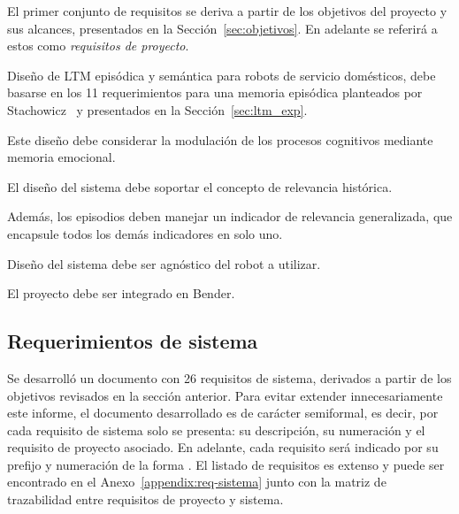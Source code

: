 El primer conjunto de requisitos se deriva a partir de los objetivos del proyecto y sus alcances, presentados en la Sección~\ref{sec:objetivos}. En adelante se referirá a estos como \textit{requisitos de proyecto}.
\begin{description}
\item {} Diseño de LTM episódica y semántica para robots de servicio domésticos, debe basarse en los 11 requerimientos para una memoria episódica planteados por Stachowicz~\cite{Stachowicz2012} y presentados en la Sección~\ref{sec:ltm_exp}.
\item {} Este diseño debe considerar la modulación de los procesos cognitivos mediante memoria emocional.
\item {} El diseño del sistema debe soportar el concepto de relevancia histórica.
\item {} Además, los episodios deben manejar un indicador de relevancia generalizada, que encapsule todos los demás indicadores en solo uno.
\item {} Diseño del sistema debe ser agnóstico del robot a utilizar.
\item {} El proyecto debe ser integrado en Bender.
\end{description}


\subsection{Requerimientos de sistema}

Se desarrolló un documento con 26 requisitos de sistema, derivados a partir de los objetivos revisados en la sección anterior. Para evitar extender innecesariamente este informe, el documento desarrollado es de carácter semiformal, es decir, por cada requisito de sistema solo se presenta: su descripción, su numeración y el requisito de proyecto asociado. En adelante, cada requisito será indicado por su prefijo y numeración de la forma . El listado de requisitos es extenso y puede ser encontrado en el Anexo~\ref{appendix:req-sistema} junto con la matriz de trazabilidad entre requisitos de proyecto y sistema.

